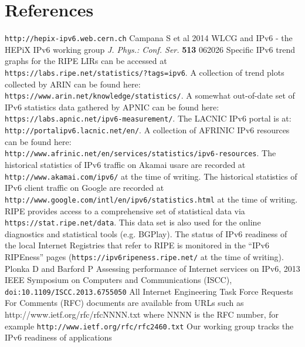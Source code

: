 \section*{References}

\begin{thebibliography}{1}
 {\tt http://hepix-ipv6.web.cern.ch}
 Campana S et al 2014 WLCG and IPv6 - the HEPiX IPv6 working group {\it J. Phys.: Conf. Ser.} {\bf513} 062026
 Specific
IPv6 trend graphs for the RIPE LIRs can be accessed at\\ {\tt https://labs.ripe.net/statistics/?tags=ipv6}.
 A collection of trend plots collected by ARIN
can be found here:\\ {\tt https://www.arin.net/knowledge/statistics/}.
 A somewhat out-of-date set of IPv6
statistics data gathered by APNIC can be found here:\\ {\tt https://labs.apnic.net/ipv6-measurement/}.
 The LACNIC IPv6 portal is at:\\ {\tt http://portalipv6.lacnic.net/en/}.
 A collection of AFRINIC IPv6 resources can be found here:\\  {\tt http://www.afrinic.net/en/services/statistics/ipv6-resources}.
 The historical statistics of IPv6 traffic on Akamai usare are recorded at {\tt http://www.akamai.com/ipv6/} at the time of writing.
 The historical statistics of IPv6 client traffic on Google are recorded at\\ {\tt http://www.google.com/intl/en/ipv6/statistics.html} at the time of writing.
 RIPE provides access to a comprehensive set of statistical
data via {\tt https://stat.ripe.net/data}. This data set is also used for
the online diagnostics and statistical tools (e.g. BGPlay). 
 The status of IPv6 readiness of the local Internet Registries
that refer to RIPE is monitored in the ``IPv6 RIPEness'' pages ({\tt https://ipv6ripeness.ripe.net/} at the time of writing).
 Plonka D and Barford P Assessing performance of Internet services on IPv6, 2013 IEEE Symposium on Computers and Communications (ISCC), {\tt doi:10.1109/ISCC.2013.6755050}
 All Internet Engineering Task Force Requests For Comments (RFC) documents are available
from URLs such as http://www.ietf.org/rfc/rfcNNNN.txt where NNNN is the RFC number, for example {\tt http://www.ietf.org/rfc/rfc2460.txt}
 Our working group tracks the IPv6 readiness of applications

\end{thebibliography}
